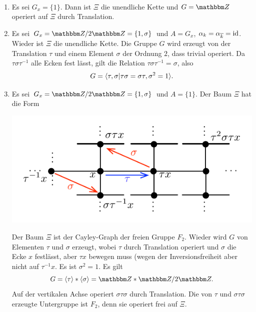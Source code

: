 \documentclass[a4paper, 12pt, twoside]{article}
\begin{document}
\BSP\
\begin{enumerate}
\item Es sei $G_x=\{1\}$. Dann ist $\Xi$ die unendliche Kette
und $G=\ZZ$ operiert auf $\Xi$ durch Translation.
\item Es sei $G_x=\ZZ/2\ZZ=\{1,\sigma\}$ und $A=G_x$,
$\alpha_k=\alpha_{\overline{k}}=\mathrm{id}$. Wieder ist $\Xi$ die
unendliche Kette. Die Gruppe $G$ wird erzeugt von der
Translation $\tau$ und einem Element $\sigma$ der Ordnung $2$,
dass trivial operiert.
Da $\tau\sigma\tau^{-1}$ alle Ecken fest lässt, gilt die Relation
$\tau\sigma\tau^{-1}=\sigma$, also
\[
G = \langle \tau,\sigma | \tau\sigma=\sigma\tau, \sigma^2=1 \rangle.
\]
\item Es sei $G_x=\ZZ/2\ZZ=\{1,\sigma\}$ und $A=\{1\}$.
Der Baum $\Xi$ hat die Form
\begin{center}
	\includegraphics{grugraImages/XiF2}
\end{center}
Der Baum $\Xi$ ist der
Cayley-Graph der freien Gruppe $F_2$.
Wieder wird $G$ von Elementen $\tau$ und $\sigma$ erzeugt, wobei
$\tau$ durch Translation operiert und $\sigma$ die Ecke $x$
festlässt, aber $\tau x$ bewegen muss (wegen der Inversionsfreiheit
aber nicht auf $\tau^{-1} x$.
Es ist $\sigma^2=1$. Es gilt
\[
G = \lag \tau \rag * \lag \sigma \rag
= \ZZ * \ZZ/2\ZZ.
\]
Auf der vertikalen Achse operiert $\sigma\tau\sigma$ durch
Translation. Die von $\tau$ und $\sigma\tau\sigma$ erzeugte
Untergruppe ist $F_2$, denn sie operiert frei auf $\Xi$.
\end{enumerate}
\end{document}
